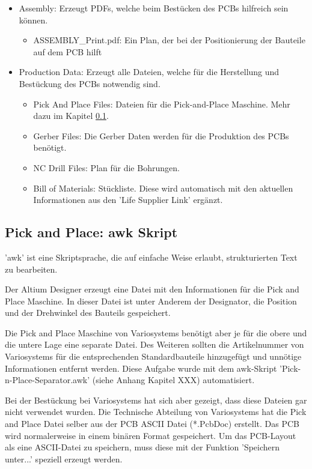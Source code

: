 \begin{itemize}
\item Assembly: Erzeugt PDFs, welche beim Bestücken des PCBs hilfreich sein können.
	\begin{itemize}
	\item ASSEMBLY\_Print.pdf: Ein Plan, der bei der Positionierung der Bauteile auf dem PCB hilft
	\end{itemize}
\item Production Data: Erzeugt alle Dateien, welche für die Herstellung und Bestückung des PCBs notwendig sind.
	\begin{itemize}
	\item Pick And Place Files: Dateien für die Pick-and-Place Maschine. Mehr dazu im Kapitel \ref{sec:awkSkript}.
	\item Gerber Files: Die Gerber Daten werden für die Produktion des PCBs benötigt.
	\item NC Drill Files: Plan für die Bohrungen.
	\item Bill of Materials: Stückliste. Diese wird automatisch mit den aktuellen Informationen aus den 'Life Supplier Link' ergänzt.
	\end{itemize}
\end{itemize}


\subsection{Pick and Place: awk Skript}\label{sec:awkSkript}
'awk' ist eine Skriptsprache, die auf einfache Weise erlaubt, strukturierten Text zu bearbeiten.

Der Altium Designer erzeugt eine Datei mit den Informationen für die Pick and Place Maschine. In dieser Datei ist unter Anderem der Designator, die Position und der Drehwinkel des Bauteils gespeichert.

Die Pick and Place Maschine von Variosystems benötigt aber je für die obere und die untere Lage eine separate Datei. Des Weiteren sollten die Artikelnummer von Variosystems für die entsprechenden Standardbauteile hinzugefügt und unnötige Informationen entfernt werden. Diese Aufgabe wurde mit dem awk-Skript 'Pick-n-Place-Separator.awk' (siehe Anhang Kapitel XXX) automatisiert.

Bei der Bestückung bei Variosystems hat sich aber gezeigt, dass diese Dateien gar nicht verwendet wurden. Die Technische Abteilung von Variosystems hat die Pick and Place Datei selber aus der PCB ASCII Datei (*.PcbDoc) erstellt. Das PCB wird normalerweise in einem binären Format gespeichert. Um das PCB-Layout als eine ASCII-Datei zu speichern, muss diese mit der Funktion 'Speichern unter...' speziell erzeugt werden.

